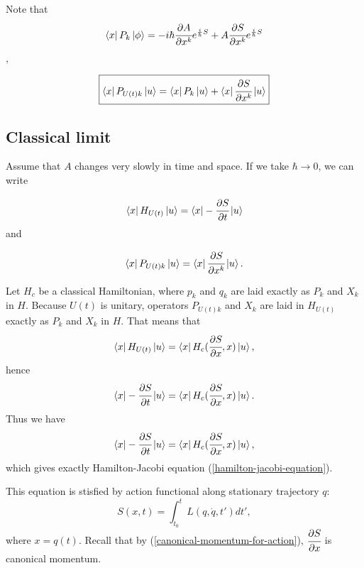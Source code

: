 \documentclass[main.tex]{subfiles}
\begin{document}
Note that
\begin{equation}
\bra{x}P_k\ket{\phi} = -i\hbar \cfrac{\partial A}{\partial x^k}e^{\frac{i}{\hbar}S}
+ A \cfrac{\partial S}{\partial x^k}e^{\frac{i}{\hbar}S}
\end{equation},

\begin{equation}
\boxed{
\bra{x}P_{U(t)k}\ket{u} = \bra{x}P_k\ket{u} + \bra{x} \cfrac{\partial S}{\partial x^k}\ket{u}}
\end{equation}
\subsection{Classical limit}

Assume that $A$ changes very slowly in time and space. If we take $\hbar \to 0$, we can write

\begin{equation}
\bra{x} H_{U(t)} \ket{u} = \bra{x} -\cfrac{\partial S}{\partial t} \ket{u}
\end{equation}
and

\begin{equation}
\bra{x} P_{U(t)k}\ket{u} = \bra{x} \cfrac{\partial S}{\partial x^k} \ket{u}.
\end{equation}

Let $H_c$ be a classical Hamiltonian, where $p_k$ and $q_k$ are laid exactly as $P_k$ and $X_k$ in $H$. Because $U(t)$ is unitary, operators $P_{U(t)k}$ and $X_k$ are laid in $H_{U(t)}$ exactly as $P_k$ and $X_k$ in $H$. That means that 
\begin{equation}
\bra{x} H_{U(t)} \ket{u} = \bra{x} H_c(\cfrac{\partial S}{\partial x}, x)\ket{u},
\end{equation}
hence
\begin{equation}
\bra{x}-\cfrac{\partial S}{\partial t} \ket{u} = \bra{x}H_c(\cfrac{\partial S}{\partial x}, x)\ket{u}.
\end{equation}
Thus we have 
\begin{equation}
\bra{x}-\cfrac{\partial S}{\partial t} \ket{u} = \bra{x}H_c(\cfrac{\partial S}{\partial x}, x)\ket{u},
\end{equation}
which gives exactly Hamilton-Jacobi equation (\ref{hamilton-jacobi-equation}).

This equation is stisfied by action functional along stationary trajectory $q$:
\begin{equation}
S(x, t) = \int^t_{t_0} L(q, \dot{q}, t') dt',
\end{equation}
where $x = q(t)$.
Recall that by (\ref{canonical-momentum-for-action}), $\cfrac{\partial S}{\partial x}$ is canonical momentum.
\end{document}
